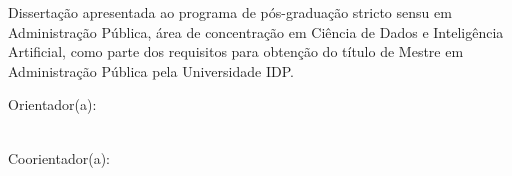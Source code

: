 \begin{titlepage}

\begin{center}
{\large \textbf{\MakeUppercase{\autora}}}
\end{center}

\vfill

\begin{center}
{\Large \textbf{\tituloDissertacao}}
\end{center}

\vfill

\begin{flushright}
\begin{minipage}{0.52\textwidth}
\singlespacing
Dissertação apresentada ao programa de pós-graduação stricto sensu em Administração Pública, área de concentração em Ciência de Dados e Inteligência Artificial, como parte dos requisitos para obtenção do título de Mestre em Administração Pública pela Universidade IDP.

\vspace{0.5cm}
Orientador(a): \orientadorDissertacao

\ifx\coorientadorDissertacao\empty
\else
\\Coorientador(a): \coorientadorDissertacao
\fi
\end{minipage}
\end{flushright}

\vfill

\begin{center}
{\large \localDissertacao}\\
{\large \anoDissertacao}
\end{center}

\end{titlepage}
